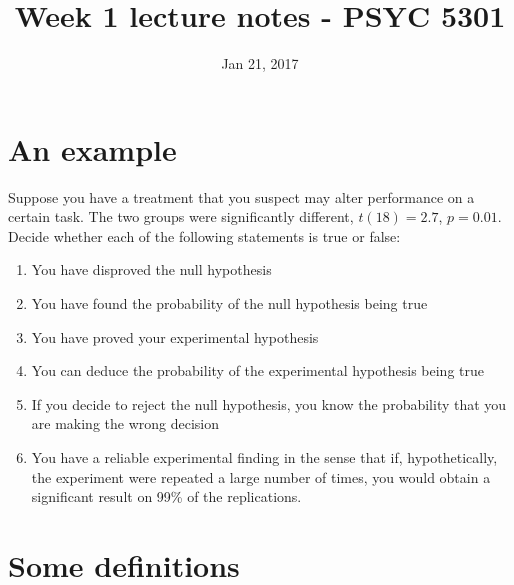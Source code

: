 \documentclass[11pt]{article}
\date{Jan 21, 2017}
\title{Week 1 lecture notes - PSYC 5301}
\begin{document}
\maketitle


\section*{An example}
\label{sec-1}
Suppose you have a treatment that you suspect may alter performance on a certain task.  The two groups were significantly different, $t(18)=2.7$, $p=0.01$.  Decide whether each of the following statements is true or false:
\begin{enumerate}
\item You have disproved the null hypothesis
\item You have found the probability of the null hypothesis being true
\item You have proved your experimental hypothesis
\item You can deduce the probability of the experimental hypothesis being true
\item If you decide to reject the null hypothesis, you know the probability that you are making the wrong decision
\item You have a reliable experimental finding in the sense that if, hypothetically, the experiment were repeated a large number of times, you would obtain a significant result on 99\% of the replications.
\end{enumerate}

\section*{Some definitions}
\label{sec-2}
\end{document}
